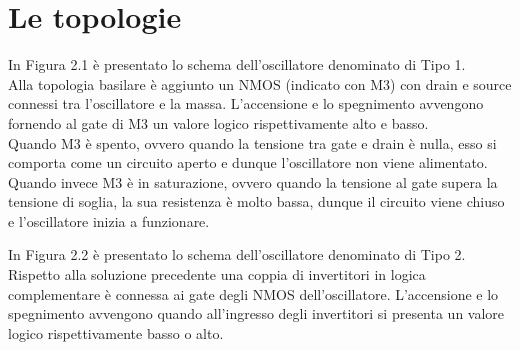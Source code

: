 \documentclass[a4paper, 12pt]{memoir}
\begin{document}
\section{Le topologie}
In Figura 2.1 è presentato lo schema dell'oscillatore denominato di Tipo 1.\\
Alla topologia basilare è aggiunto un NMOS (indicato con M3) con
drain e source connessi tra l'oscillatore e la massa. L'accensione e lo
spegnimento avvengono fornendo al gate di M3 un valore logico rispettivamente
alto e basso.\\
Quando M3 è spento, ovvero quando la tensione tra gate e drain è
nulla, esso si comporta come un circuito aperto e dunque l'oscillatore non
viene alimentato. Quando invece M3 è in saturazione, ovvero quando la tensione 
al gate supera la tensione di soglia, la sua resistenza è molto bassa, dunque 
il circuito viene chiuso e l'oscillatore inizia a funzionare.

In Figura 2.2 è presentato lo schema dell'oscillatore denominato di Tipo 2.\\
Rispetto alla soluzione precedente una coppia di invertitori in logica
complementare è connessa ai gate degli NMOS dell'oscillatore. L'accensione e
lo spegnimento avvengono quando all'ingresso degli invertitori si presenta un
valore logico rispettivamente basso o alto.
\end{document}
